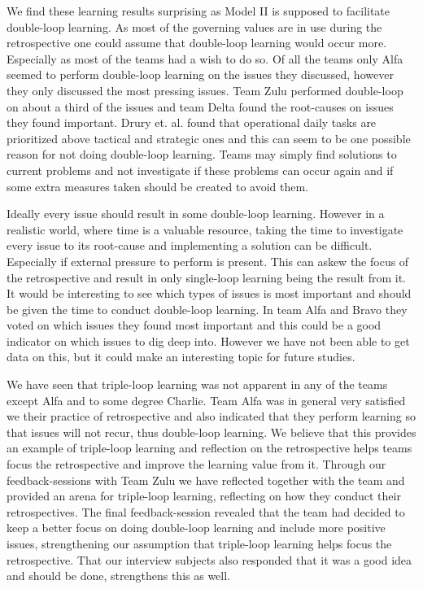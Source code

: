 We find these learning results surprising as Model II is supposed to facilitate double-loop learning. As most of the governing values are in use during the retrospective one could assume that double-loop learning would occur more. Especially as most of the teams had a wish to do so. Of all the teams only Alfa seemed to perform double-loop learning on the issues they discussed, however they only discussed the most pressing issues. Team Zulu performed double-loop on about a third of the issues and team Delta found the root-causes on issues they found important. Drury et. al. \cite{Drury2012} found that operational daily tasks are prioritized above tactical and strategic ones and this can seem to be one possible reason for not doing double-loop learning. Teams may simply find solutions to current problems and not investigate if these problems can occur again and if some extra measures taken should be created to avoid them. 

Ideally every issue should result in some double-loop learning. However in a realistic world, where time is a valuable resource, taking the time to investigate every issue to its root-cause and implementing a solution can be difficult. Especially if external pressure to perform is present. This can askew the focus of the retrospective and result in only single-loop learning being the result from it. It would be interesting to see which types of issues is most important and should be given the time to conduct double-loop learning. In team Alfa and Bravo they voted on which issues they found most important and this could be a good indicator on which issues to dig deep into. However we have not been able to get data on this, but it could make an interesting topic for future studies.

We have seen that triple-loop learning was not apparent in any of the teams except Alfa and to some degree Charlie. Team Alfa was in general very satisfied we their practice of retrospective and also indicated that they perform learning so that issues will not recur, thus double-loop learning. We believe that this provides an example of triple-loop learning and reflection on the retrospective helps teams focus the retrospective and improve the learning value from it. Through our feedback-sessions with Team Zulu we have reflected together with the team and provided an arena for triple-loop learning, reflecting on how they conduct their retrospectives. The final feedback-session revealed that the team had decided to keep a better focus on doing double-loop learning and include more positive issues, strengthening our assumption that triple-loop learning helps focus the retrospective. That our interview subjects also responded that it was a good idea and should be done, strengthens this as well.

